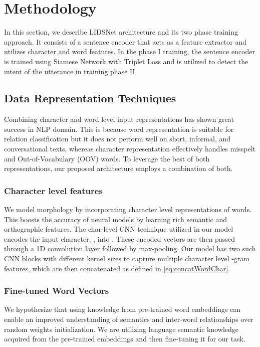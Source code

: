 \documentclass[conference]{IEEEtran}
\begin{document}
\section{Methodology}\label{sec:methodology}

In this section, we describe LIDSNet architecture and its two phase training approach. It consists of a sentence encoder that acts as a feature extractor and utilizes character and word features. In the phase I training, the sentence encoder is trained using Siamese Network with Triplet Loss and is utilized to detect the intent of the utterance in training phase II.

\subsection{Data Representation Techniques}\label{sec:dataRepresentationTechniques}

Combining character and word level input representations has shown great success in NLP domain. This is because word representation is suitable for relation classification but it does not perform well on short, informal, and conversational texts, whereas character representation effectively handles misspelt and Out-of-Vocabulary (OOV) words. To leverage the best of both representations, our proposed architecture employs a combination of both.

\subsubsection{Character level features}\label{sec:characterLevelFeatures}

We model morphology by incorporating character level representations of words. This boosts the accuracy of neural  models by learning rich semantic and orthographic features. The char-level CNN technique utilized in our model encodes the input character, , into . These encoded vectors are then passed through a 1D convolution layer followed by max-pooling. Our model has two such CNN blocks with different kernel sizes to capture multiple character level -gram features, which are then concatenated as defined in \eqref{eq:concatWordChar}.

\subsubsection{Fine-tuned Word Vectors}\label{sec:fineTunedWordVectors}

We hypothesize that using knowledge from pre-trained word embeddings can enable an improved understanding of semantics and inter-word relationships over random weights initialization. We are utilizing language semantic knowledge acquired from the pre-trained embeddings and then fine-tuning it for our task.
\end{document}
